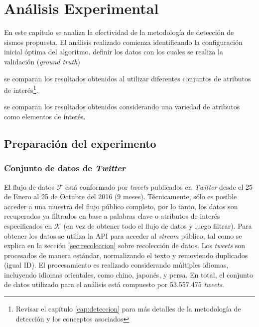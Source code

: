 

\chapter{Análisis Experimental}
\label{cap:analisis}

En este capítulo se analiza la efectividad de la metodología de detección de sismos propuesta. 
%
El análisis realizado comienza identificando la configuración inicial óptima del algoritmo. 
%
definir los datos con los cuales se realiza la validación (\textit{ground truth}) 

se comparan los resultados obtenidos al utilizar diferentes conjuntos de atributos de interés\footnote{Revisar el capítulo \ref{cap:deteccion} para más detalles de la metodología de detección y los conceptos asociados}.


se comparan los resultados obtenidos considerando una variedad de atributos como elementos de interés.


\section{Preparación del experimento}


	\subsection{Conjunto de datos de \textit{Twitter}}
	
		El flujo de datos $\mathcal{F}$ está conformado por \textit{tweets} publicados en \textit{Twitter} desde el 25 de Enero al 25 de Octubre del 2016 (9 meses). Técnicamente, sólo es posible acceder a una muestra del flujo público completo, por lo tanto, los datos son recuperados ya filtrados en base a palabras clave o atributos de interés especificados en $\mathcal{K}$ (en vez de obtener todo el flujo de datos y luego filtrar).  Para obtener los datos se utiliza la API para acceder al \textit{stream} público, tal como se explica en la sección \ref{sec:recoleccion} sobre recolección de datos. Los \textit{tweets} son procesados de manera estándar, normalizando el texto y removiendo duplicados (igual ID). El procesamiento es realizado considerando múltiples idiomas, incluyendo idiomas orientales, como chino, japonés, y persa. En total, el conjunto de datos utilizado para el análisis está compuesto por 53.557.475 \textit{tweets}.
		
